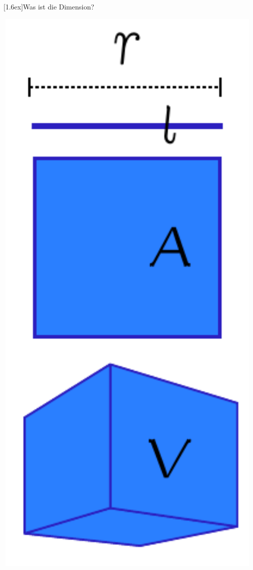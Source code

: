 \documentclass[final]{beamer}
\newlength{\columnheight}
\newlength{\marginw}
\newlength{\tw}
\newlength{\colw}
\newenvironment{myTwoColPoster}{%
  \begin{minipage}[t]{\textwidth}%
    \hspace*{\marginw}%
    \hspace*{9.5bp}%
    \begin{minipage}[t]{\tw}}%
  {\end{minipage}%
   \hspace*{\marginw}%
   \end{minipage}}
\newenvironment{myCol}%
    {\begin{minipage}[t][\columnheight][t]{\colw}}%
    {\end{minipage}}
\newenvironment{textblock}[1]%
    {\begin{block}{\rule[-0.6ex]{0pt}{2.4ex}\raisebox{-0.25ex}[1.6ex]{#1}}%
     \vspace*{5mm}}%
    {\vspace*{5mm}\end{block}}
\begin{document}
\begin{frame}[t]{}
\begin{myTwoColPoster}
\begin{myCol}
\begin{textblock}{Was ist die Dimension?}
\begin{minipage}[c]{0.7\textwidth}
\begin{itemize}
\begin{itemize}
        \end{itemize}
      \end{itemize}
    \end{minipage}
    \hfill
    \begin{minipage}[c]{0.29\textwidth}
      \begin{center}
        \includegraphics[width=0.99\textwidth]{fig/groessen}
      \end{center}
    \end{minipage}
    

\end{textblock}
\end{myCol}
\end{myTwoColPoster}
\end{frame}
\end{document}
